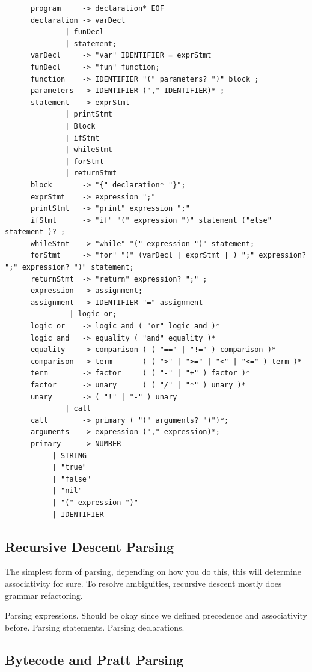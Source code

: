   \begin{example}
    \label{ex:grammar-rule-for-jlox}
    \begin{lstlisting}
      program     -> declaration* EOF  
      declaration -> varDecl 
		      | funDecl
		      | statement;
      varDecl     -> "var" IDENTIFIER = exprStmt
      funDecl     -> "fun" function; 
      function    -> IDENTIFIER "(" parameters? ")" block ; 
      parameters  -> IDENTIFIER ("," IDENTIFIER)* ;
      statement   -> exprStmt 
		      | printStmt 
		      | Block 
		      | ifStmt 
		      | whileStmt
		      | forStmt 
		      | returnStmt
      block       -> "{" declaration* "}";
      exprStmt    -> expression ";"
      printStmt   -> "print" expression ";"
      ifStmt      -> "if" "(" expression ")" statement ("else" statement )? ;
      whileStmt   -> "while" "(" expression ")" statement;
      forStmt     -> "for" "(" (varDecl | exprStmt | ) ";" expression? ";" expression? ")" statement;
      returnStmt  -> "return" expression? ";" ;
      expression  -> assignment; 
      assignment  -> IDENTIFIER "=" assignment 
		       | logic_or; 
      logic_or    -> logic_and ( "or" logic_and )*  
      logic_and   -> equality ( "and" equality )*
      equality    -> comparison ( ( "==" | "!=" ) comparison )*
      comparison  -> term       ( ( ">" | ">=" | "<" | "<=" ) term )*
      term        -> factor     ( ( "-" | "+" ) factor )*
      factor      -> unary      ( ( "/" | "*" ) unary )*
      unary       -> ( "!" | "-" ) unary 
		      | call
      call        -> primary ( "(" arguments? ")")*; 
      arguments   -> expression ("," expression)*;
      primary     -> NUMBER
		   | STRING
		   | "true"
		   | "false"
		   | "nil"
		   | "(" expression ")" 
		   | IDENTIFIER
    \end{lstlisting}
  \end{example}

\subsection{Recursive Descent Parsing}

  The simplest form of parsing, depending on how you do this, this will determine associativity for sure. To resolve ambiguities, recursive descent mostly does grammar refactoring. 

  Parsing expressions. Should be okay since we defined precedence and associativity before. 
  Parsing statements. 
  Parsing declarations. 

\subsection{Bytecode and Pratt Parsing}

